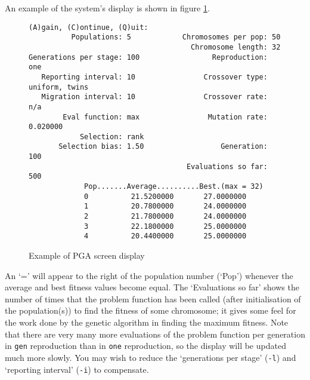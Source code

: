 An example of the system's display is shown in figure \ref{fig:output}.
\begin{figure}[bthp]
\begin{center}
\begin{verbatim}
(A)gain, (C)ontinue, (Q)uit: 
          Populations: 5            Chromosomes per pop: 50
                                      Chromosome length: 32
Generations per stage: 100                 Reproduction: one
   Reporting interval: 10                Crossover type: uniform, twins
   Migration interval: 10                Crossover rate: n/a
        Eval function: max                Mutation rate: 0.020000
            Selection: rank
       Selection bias: 1.50                  Generation: 100
                                     Evaluations so far: 500
             Pop.......Average..........Best.(max = 32)
             0          21.5200000       27.0000000
             1          20.7800000       24.0000000
             2          21.7800000       24.0000000
             3          22.1800000       25.0000000
             4          20.4400000       25.0000000
\end{verbatim}
\caption{Example of PGA screen display}
\label{fig:output}
\end{center}
\end{figure}
An `=' will appear to the right of the population number (`Pop') whenever
the average and best fitness values become equal.
The `Evaluations so far' shows the number of times that the problem
function has been called (after initialisation of the population(s))
to find the fitness of some chromosome; it gives some feel for the
work done by the genetic algorithm in finding the maximum fitness.
Note that there are very many more evaluations of the problem function
per generation in \verb|gen| reproduction than in \verb|one|
reproduction, so the display will be updated much more slowly. You may
wish to reduce the `generations per stage' (\verb|-l|) and `reporting
interval' (\verb|-i|) to compensate.

